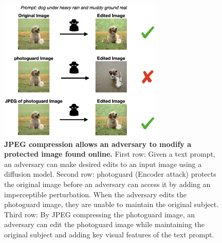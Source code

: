 \begin{figure}[t]
\begin{center}
\includegraphics[width=0.7\textwidth]{images/2-overview-figure.001.png}
\end{center}
\caption{\textbf{JPEG compression allows an adversary to modify a protected image found online.} First row: Given a text prompt, an adversary can make desired edits to an input image using a diffusion model. Second row: photoguard (Encoder attack) \citep{salman2023raising} protects the original image before an adversary can access it by adding an imperceptible perturbation. When the adversary edits the photoguard image, they are unable to maintain the original subject. Third row: By JPEG compressing the photoguard image, an adversary can edit the photoguard image while maintaining the original subject and adding key visual features of the text prompt.}
\label{fig:img2img-overview}
\end{figure}